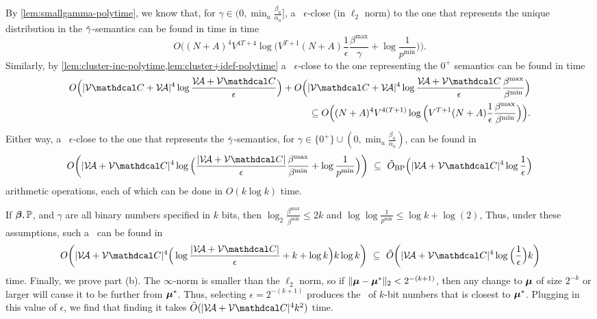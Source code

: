 \begin{subappendices}
\begin{lproof}
    By \cref{lem:smallgamma-polytime},
    we know that, for $\gamma \in (0, \min_a \frac{\beta_a}{\alpha_a}]$,
    a \actree\ $\epsilon$-close (in $\ell_2$ norm) to
    the one that represents the unique distribution in the
    $\zogamma$-semantics can be found in time
    in time
    \[
        O\Big(  (N+A)^4 V^{4T+4} \log \Big(V^{T+1}(N+A)\frac{1}{\epsilon}  \frac{\beta^{\max}}{\gamma}
         + \log \frac{1}{p^{\min}} \Big)  \Big).
    \]
    Similarly, by \cref{lem:cluster-inc-polytime,lem:cluster+idef-polytime}
    a \actree\ $\epsilon$-close to the one representing the $0^+$
    semantics can be found in time
    \begin{align*}
        O\Big( |\V\C + \V\!\Ar|^{4} \log \frac{\V\!\Ar+ \V\C}{\epsilon}\Big) +
        O\Big( |\V\C + \V\!\Ar|^{4} \log \frac{\V\!\Ar+ \V\C}{\epsilon}\frac{\beta^{\max}}{\beta^{\min}}\Big)
        \\
        \subseteq
        O\Big(  (N+A)^4 V^{4(T+1)} \log \Big( V^{T+1} (N+A)
            \frac{1}{\epsilon}  \frac{\beta^{\max}}{\beta^{\min}} \Big)
            \Big).
    \end{align*}
    Either way, a \actree\ $\epsilon$-close to the one that represents the $\zogamma$-semantics, for $\gamma \in \{0^+ \} \cup (0, \min_a \frac{\beta_a}{\alpha_a})$,
    can be found in
    \[
        O \bigg(|\V\!\Ar + \V \C|^{4}  \log \Big( \frac{|\V\!\Ar + \V \C|}{\epsilon} \frac{\beta^{\max}}{\beta^{\min}} + \log \frac1{p^{\min}} \Big) \bigg)
        ~\subseteq~
        \tilde O_{\text{BP}}\Big(|\V\!\Ar + \V \C|^{4}\log \frac{1}{\epsilon} \Big)
    \]
    arithmetic operations, each of which can be done in $O(k \log k)$ time. 
    
    If $\boldsymbol\beta, \mathbb P$, and $\gamma$ are all binary numbers specified in $k$
    bits, then $\log_2 \frac{\beta^{\max}}{\beta^{\min}} \le 2k$ and $\log \log \frac{1}{p^{\min}} \le \log k + \log(2)$, 
    Thus, under these assumptions, such a \actree\ 
    can be found in 
    \begin{align*}
        O \bigg(|\V\!\Ar + \V \C|^{4}  \Big( \log \frac{|\V\!\Ar + \V \C|}{\epsilon} + k + \log k \Big) k \log k \bigg) 
    ~\subseteq~
        \tilde O \bigg(|\V\!\Ar + \V \C|^{4}  \log \Big( \frac{1}{\epsilon} \Big) k  \bigg) 
    \end{align*}
    time.    
    Finally, we prove part (b).  The $\infty$-norm is smaller than the $\ell_2$ norm,
    so if $\Vert \boldsymbol\mu - \boldsymbol\mu^* \Vert_2 < 2^{-(k+1)}$, then any change to $\boldsymbol\mu$ 
    of size $2^{-k}$ or larger will cause it to be further from $\boldsymbol\mu^*$.
    Thus, selecting $\epsilon = 2^{-(k+1)}$ produces the \actree\ of $k$-bit
    numbers that is closest to $\boldsymbol\mu^*$.  Plugging in this value of $\epsilon$, 
    we find that finding it takes 
    $
        \tilde O (|\V\!\Ar + \V \C|^{4} k^2 )
    $ time. 
\end{lproof}


\end{subappendices}

